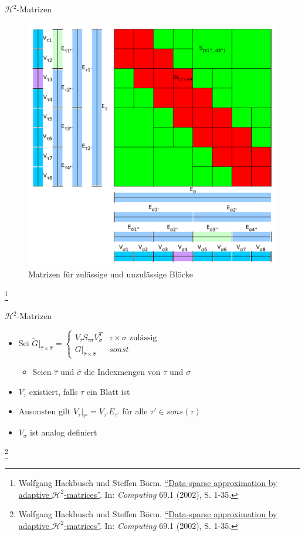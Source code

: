 \documentclass[10pt]{beamer}
\let\svthefootnote\thefootnote
\begin{document}
\begin{frame}{\(\mathcal{H}^2\)-Matrizen}
\begin{figure}
\begin{overprint}
      \centering\includegraphics[width=.5\linewidth]{figures/fg-h2-near-far-field-matrices.pdf}\caption{Matrizen für zulässige und unzulässige Blöcke}
    \end{overprint}
  \end{figure}

  \footnotesize
  \let\thefootnote\relax\footnote{Wolfgang Hackbusch und Steffen B{\"o}rm.
  \href{https://link.springer.com/article/10.1007\%2Fs00607-002-1450-4?LI=true}{``Data-sparse approximation by adaptive \(\mathcal{H}^2\)-matrices''}. In:
   \textit{Computing} 69.1 (2002), S. 1-35.}
  \addtocounter{footnote}{-1}\let\thefootnote\svthefootnote\relax
  \normalsize
\end{frame}

\begin{frame}{\(\mathcal{H}^2\)-Matrizen}
  \begin{itemize}
    \item Sei \(\tilde{G}|_{\hat{\tau} \times \hat{\sigma}} =
    \begin{cases}
      V_{\tau} S_{\tau \sigma} V_{\sigma}^T & \tau \times \sigma \text{ zulässig} \\
      G|_{\hat{\tau} \times \hat{\sigma}}   & sonst
    \end{cases}\)
    \begin{itemize}
      \item Seien \(\hat{\tau}\) und \( \hat{\sigma}\) die Indexmengen von \(\tau\) und \(\sigma\)
    \end{itemize}
    \item \(V_{\tau}\) existiert, falls \(\tau\) ein Blatt ist
    \item Ansonsten gilt \(V_{\tau}|_{\hat{\tau} '} = V_{\tau '} E_{\tau '}\) für alle  \(\tau ' \in sons(\tau)\)
    \item \(V_{\sigma}\) ist analog definiert
  \end{itemize}

  \footnotesize
  \let\thefootnote\relax\footnote{Wolfgang Hackbusch und Steffen B{\"o}rm.
  \href{https://link.springer.com/article/10.1007\%2Fs00607-002-1450-4?LI=true}{``Data-sparse approximation by adaptive \(\mathcal{H}^2\)-matrices''}. In:
   \textit{Computing} 69.1 (2002), S. 1-35.}
  \addtocounter{footnote}{-1}\let\thefootnote\svthefootnote\relax
  \normalsize
\end{frame}
\end{document}
